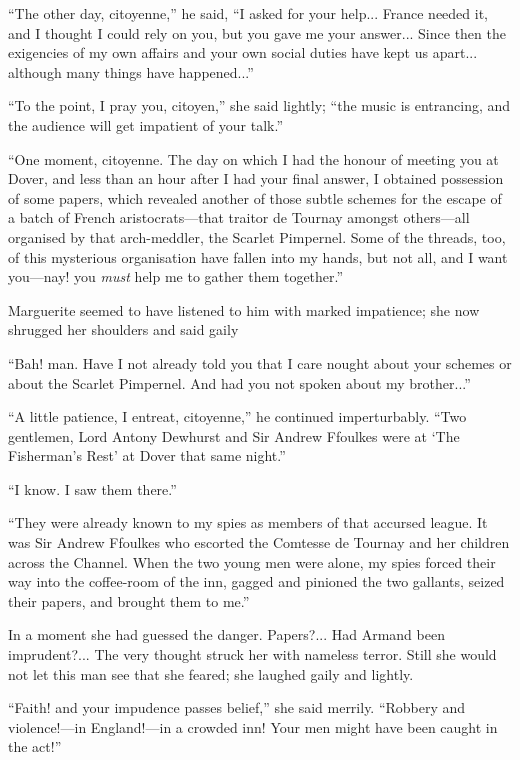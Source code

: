 \enquote{The other day, citoyenne,} he said, \enquote{I asked for your help... France needed it, and I thought I could rely on you, but you gave me your answer... Since then the exigencies of my own affairs and your own social duties have kept us apart... although many things have happened...}

\enquote{To the point, I pray you, citoyen,} she said lightly; \enquote{the music is entrancing, and the audience will get impatient of your talk.}

\enquote{One moment, citoyenne. The day on which I had the honour of meeting you at Dover, and less than an hour after I had your final answer, I obtained possession of some papers, which revealed another of those subtle schemes for the escape of a batch of French aristocrats---that traitor de Tournay amongst others---all organised by that arch-meddler, the Scarlet Pimpernel. Some of the threads, too, of this mysterious organisation have fallen into my hands, but not all, and I want you---nay! you \textit{must} help me to gather them together.}

Marguerite seemed to have listened to him with marked impatience; she now shrugged her shoulders and said gaily\longdash


\enquote{Bah! man. Have I not already told you that I care nought about your schemes or about the Scarlet Pimpernel. And had you not spoken about my brother...}

\enquote{A little patience, I entreat, citoyenne,} he continued imperturbably. \enquote{Two gentlemen, Lord Antony Dewhurst and Sir Andrew Ffoulkes were at \enquote{The Fisherman's Rest} at Dover that same night.}

\enquote{I know. I saw them there.}

\enquote{They were already known to my spies as members of that accursed league. It was Sir Andrew Ffoulkes who escorted the Comtesse de Tournay and her children across the Channel. When the two young men were alone, my spies forced their way into the coffee-room of the inn, gagged and pinioned the two gallants, seized their papers, and brought them to me.}

In a moment she had guessed the danger. Papers?... Had Armand been imprudent?... The very thought struck her with nameless terror. Still she would not let this man see that she feared; she laughed gaily and lightly.

\enquote{Faith! and your impudence passes belief,} she said merrily. \enquote{Robbery and violence!---in England!---in a crowd\-ed inn! Your men might have been caught in the act!}

